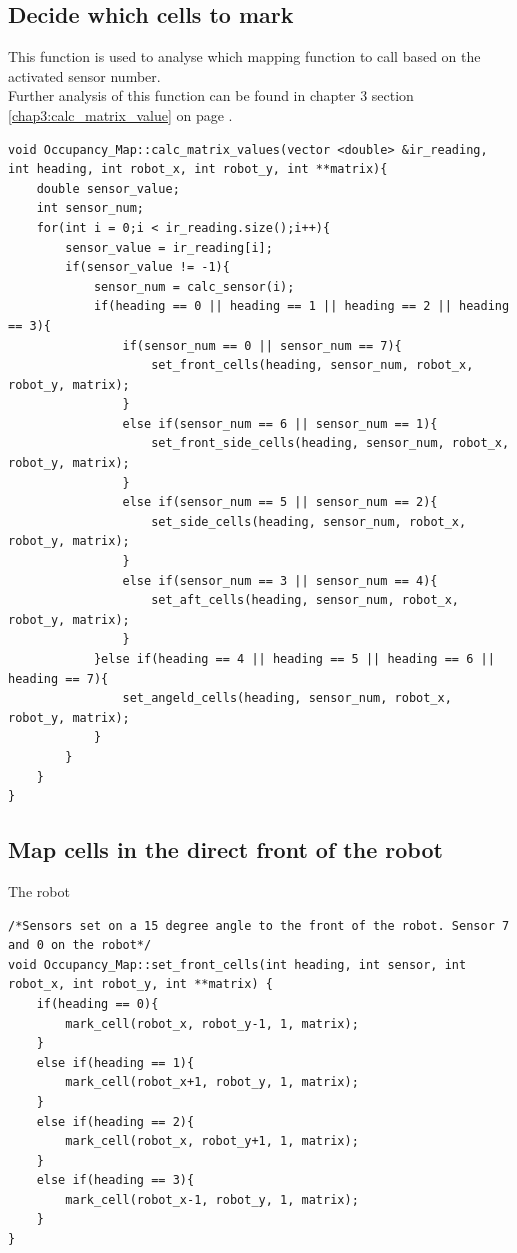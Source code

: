 \subsection{Decide which cells to mark}
\label{code:calc_matrix_values}
This function is used to analyse which mapping function to call based on the activated sensor number. \\
Further analysis of this function can be found in chapter 3 section \ref{chap3:calc_matrix_value} on page \pageref{chap3:calc_matrix_value}.
\begin{lstlisting}[caption = {calculate which cells to mark}]
void Occupancy_Map::calc_matrix_values(vector <double> &ir_reading, int heading, int robot_x, int robot_y, int **matrix){
    double sensor_value;
    int sensor_num;
    for(int i = 0;i < ir_reading.size();i++){
        sensor_value = ir_reading[i];
        if(sensor_value != -1){
            sensor_num = calc_sensor(i);
            if(heading == 0 || heading == 1 || heading == 2 || heading == 3){
                if(sensor_num == 0 || sensor_num == 7){
                    set_front_cells(heading, sensor_num, robot_x, robot_y, matrix);
                }
                else if(sensor_num == 6 || sensor_num == 1){
                    set_front_side_cells(heading, sensor_num, robot_x, robot_y, matrix);
                }
                else if(sensor_num == 5 || sensor_num == 2){
                    set_side_cells(heading, sensor_num, robot_x, robot_y, matrix);
                }
                else if(sensor_num == 3 || sensor_num == 4){
                    set_aft_cells(heading, sensor_num, robot_x, robot_y, matrix);
                }
            }else if(heading == 4 || heading == 5 || heading == 6 || heading == 7){
                set_angeld_cells(heading, sensor_num, robot_x, robot_y, matrix);
            }
        }
    }
}
\end{lstlisting}

\subsection{Map cells in the direct front of the robot}
\label{code:set_front}
The robot

\begin{lstlisting}[caption = {Code to set cells in front of the robot}]
/*Sensors set on a 15 degree angle to the front of the robot. Sensor 7 and 0 on the robot*/
void Occupancy_Map::set_front_cells(int heading, int sensor, int robot_x, int robot_y, int **matrix) {
    if(heading == 0){
        mark_cell(robot_x, robot_y-1, 1, matrix);
    }
    else if(heading == 1){
        mark_cell(robot_x+1, robot_y, 1, matrix);
    }
    else if(heading == 2){
        mark_cell(robot_x, robot_y+1, 1, matrix);
    }
    else if(heading == 3){
        mark_cell(robot_x-1, robot_y, 1, matrix);
    }
}
\end{lstlisting}

